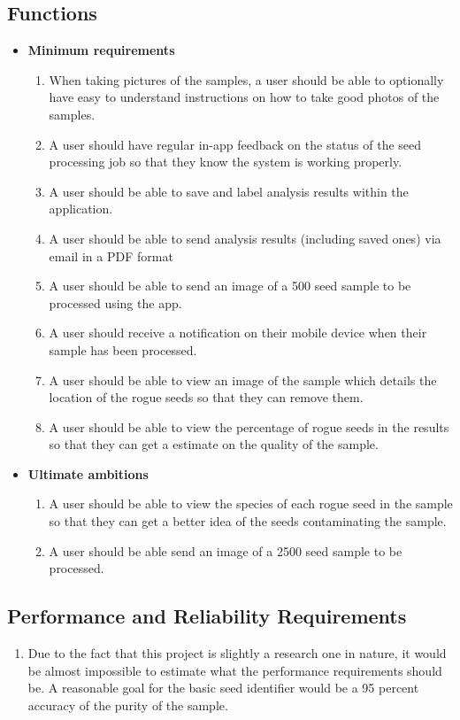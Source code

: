 \documentclass[onecolumn, draftclsnofoot,10pt, compsoc]{IEEEtran}
\begin{document}
\subsection{Functions}
\begin{itemize}
\item
\textbf{Minimum requirements}
\begin{enumerate}
\item
When taking pictures of the samples, a user should be able to optionally have easy to understand instructions on how to take good photos of the samples. 
\item
A user should have regular in-app feedback on the status of the seed processing job so that they know the system is working properly. 
\item
A user should be able to save and label analysis results within the application.
\item
A user should be able to send analysis results (including saved ones) via email in a PDF format
\item
A user should be able to send an image of a 500 seed sample to be processed using the app. 
\item
A user should receive a notification on their mobile device when their sample has been processed. 
\item
A user should be able to view an image of the sample which details the location of the rogue seeds so that they can remove them.
\item
A user should be able to view the percentage of rogue seeds in the results so that they can get a estimate on the quality of the sample.
\end{enumerate}
\item
\textbf{Ultimate ambitions}
\begin{enumerate}
\item
A user should be able to view the species of each rogue seed in the sample so that they can get a better idea of the seeds contaminating the sample. 
\item
A user should be able send an image of a 2500 seed sample to be processed. 
\end{enumerate}
\end{itemize}

\subsection{Performance and Reliability Requirements}
\begin{enumerate}
\item
Due to the fact that this project is slightly a research one in nature, it would be almost impossible to estimate what the performance requirements should be. A reasonable goal for the basic seed identifier would be a 95 percent accuracy of the purity of the sample. 
\end{enumerate}
\end{document}
